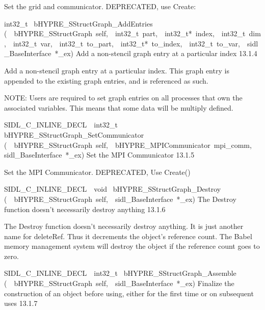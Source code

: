 \documentclass{article}
\begin{document}
\begin{cxxentry}
\begin{cxxentry}
\begin{cxxfunction}
\begin{cxxdoc}
Set the grid and communicator.
DEPRECATED, use Create:
\end{cxxdoc}
\end{cxxfunction}
\begin{cxxfunction}
{int32\_t\ }
        {bHYPRE\_SStructGraph\_AddEntries}
        {(\ \ bHYPRE\_SStructGraph\ self,\ \ int32\_t\ part,\ \ int32\_t*\ index,\ \ int32\_t\ dim,\ \ int32\_t\ var,\ \ int32\_t\ to\_part,\ \ int32\_t*\ to\_index,\ \ int32\_t\ to\_var,\ \ sidl\_BaseInterface\ *\_ex)}
        {
Add a non-stencil graph entry at a particular index}
        {13.1.4}
\begin{cxxdoc}

Add a non-stencil graph entry at a particular index.  This
graph entry is appended to the existing graph entries, and is
referenced as such.

NOTE: Users are required to set graph entries on all
processes that own the associated variables.  This means that
some data will be multiply defined.
\end{cxxdoc}
\end{cxxfunction}
\begin{cxxfunction}
{SIDL\_C\_INLINE\_DECL\ \ int32\_t\ }
        {bHYPRE\_SStructGraph\_SetCommunicator}
        {(\ \ bHYPRE\_SStructGraph\ self,\ \ bHYPRE\_MPICommunicator\ mpi\_comm,\ \ sidl\_BaseInterface\ *\_ex)}
        {
Set the MPI Communicator}
        {13.1.5}
\begin{cxxdoc}

Set the MPI Communicator.  DEPRECATED, Use Create()
\end{cxxdoc}
\end{cxxfunction}
\begin{cxxfunction}
{SIDL\_C\_INLINE\_DECL\ \ void\ }
        {bHYPRE\_SStructGraph\_Destroy}
        {(\ \ bHYPRE\_SStructGraph\ self,\ \ sidl\_BaseInterface\ *\_ex)}
        {
The Destroy function doesn't necessarily destroy anything}
        {13.1.6}
\begin{cxxdoc}

The Destroy function doesn't necessarily destroy anything.
It is just another name for deleteRef.  Thus it decrements the
object's reference count.  The Babel memory management system will
destroy the object if the reference count goes to zero.
\end{cxxdoc}
\end{cxxfunction}
\begin{cxxfunction}
{SIDL\_C\_INLINE\_DECL\ \ int32\_t\ }
        {bHYPRE\_SStructGraph\_Assemble}
        {(\ \ bHYPRE\_SStructGraph\ self,\ \ sidl\_BaseInterface\ *\_ex)}
        {
Finalize the construction of an object before using, either
for the first time or on subsequent uses}
        {13.1.7}
\begin{cxxdoc}


\end{cxxdoc}
\end{cxxfunction}
\end{cxxentry}
\end{cxxentry}
\end{document}
